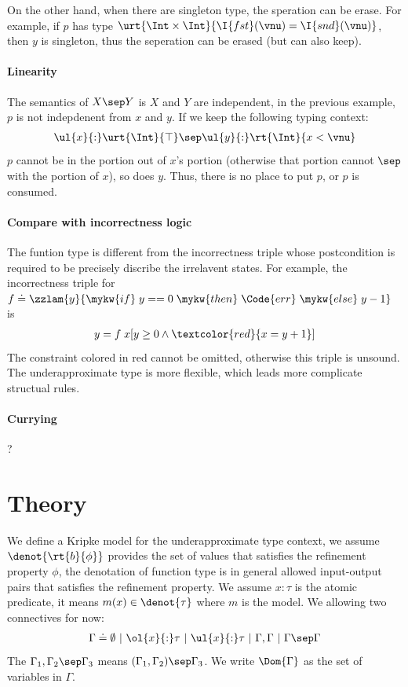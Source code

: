On the other hand, when there are singleton type, the speration can be erase. For example, if $p$ has type $\urt{\Int\times\Int}{\I{fst}(\vnu) = \I{snd}(\vnu)}$, then $y$ is singleton, thus the seperation can be erased (but can also keep).

\paragraph{Linearity} The semantics of $X \sep Y$ is $X$ and $Y$ are independent, in the previous example, $p$ is not indepdenent from $x$ and $y$. If we keep the following typing context:
\begin{align*}
    \ul{x}{:}\urt{\Int}{\top} \sep \ul{y}{:}\rt{\Int}{x < \vnu}
\end{align*}\noindent
$p$ cannot be in the portion out of $x$'s portion (otherwise that portion cannot $\sep$ with the portion of $x$), so does $y$. Thus, there is no place to put $p$, or $p$ is consumed.

\paragraph{Compare with incorrectness logic} The funtion type is different from the incorrectness triple whose postcondition is required to be precisely discribe the irrelavent states. For example, the incorrectness triple for $f \doteq \zzlam{y}{\mykw{if}\; y == 0 \;\mykw{then}\; \Code{err} \;\mykw{else}\; y - 1}$ is
\begin{align*}
    [x \geq 0] y = f\;x [ y \geq 0 \land \textcolor{red}{x = y + 1}]
\end{align*}\noindent
The constraint colored in red cannot be omitted, otherwise this triple is unsound. The underapproximate type is more flexible, which leads more complicate structual rules.



\paragraph{Currying} ?


\section{Theory}

We define a Kripke model for the underapproximate type context, we assume $\denot{\rt{b}{\phi}}$ provides the set of values that satisfies the refinement property $\phi$, the denotation of function type is in general allowed input-output pairs that satisfies the refinement property. We assume $x{:}\tau$ is the atomic predicate, it means $m(x) \in \denot{\tau}$ where $m$ is the model. We allowing two connectives for now:
\begin{align*}
    \Gamma \doteq \emptyset ~|~ \ol{x}{:}\tau ~|~ \ul{x}{:}\tau ~|~ \Gamma, \Gamma ~|~ \Gamma \sep \Gamma
\end{align*}\noindent
The $\Gamma_1, \Gamma_2 \sep \Gamma_3$ means $(\Gamma_1, \Gamma_2) \sep \Gamma_3$. We write $\Dom{\Gamma}$ as the set of variables in $\Gamma$.

